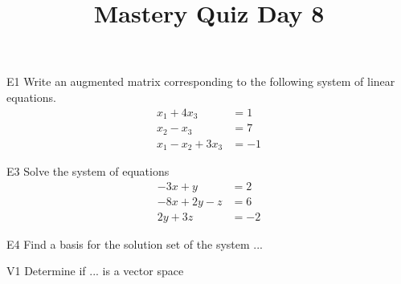 \documentclass{sbgLAquiz}
\title{Mastery Quiz Day 8 }
\begin{document}
\begin{problem}{E1}
Write an augmented matrix corresponding to the following system of linear equations.
\begin{align*}
x_1+4x_3 &= 1 \\
x_2-x_3 &= 7 \\
x_1-x_2+3x_3 &= -1
\end{align*}
\end{problem}

\begin{problem}{E3}
Solve the system of equations
\begin{align*}
-3x +y &= 2\\
-8x+2y-z &= 6 \\
2y+3z &= -2
\end{align*}


\end{problem}
\newpage

\begin{problem}{E4}
Find a basis for the solution set of the system ...
\end{problem}

\begin{problem}{V1}
Determine if ... is a vector space
\end{problem}
\end{document}
